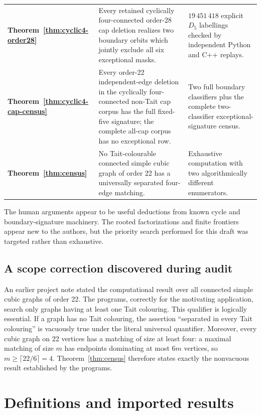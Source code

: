\documentclass[11pt]{article}
\theoremstyle{definition}
\theoremstyle{remark}
\begin{document}
\begin{center}
\begin{tabularx}{\textwidth}{@{}
  >{\raggedright\arraybackslash\bfseries}p{}
  >{\raggedright\arraybackslash}X
  >{\raggedright\arraybackslash}p{}@{}}
Theorem~\ref{thm:cyclic4-order28}
  & Every retained cyclically four-connected order-28 cap deletion
    realizes two boundary orbits which jointly exclude all six
    exceptional masks.
  & \(19\,451\,418\) explicit \(D_5\) labellings checked by independent
    Python and C++ replays.\\
Theorem~\ref{thm:cyclic4-cap-census}
  & Every order-22 independent-edge deletion in the cyclically
    four-connected non-Tait cap corpus has the full fixed-five signature;
    the complete all-cap corpus has no exceptional row.
  & Two full boundary classifiers plus the complete two-classifier
    exceptional-signature census.\\
Theorem~\ref{thm:census}
  & No Tait-colourable connected simple cubic graph of order 22 has a
    universally separated four-edge matching.
  & Exhaustive computation with two algorithmically different
    enumerators.\\
\bottomrule
\end{tabularx}
\end{center}

The human arguments appear to be useful deductions from known cycle and
boundary-signature machinery.  The rooted factorizations and finite
frontiers appear new to the authors, but the priority search performed
for this draft was targeted rather than exhaustive.

\subsection*{A scope correction discovered during audit}

An earlier project note stated the computational result over all
connected simple cubic graphs of order 22.  The programs, correctly for
the motivating application, search only graphs having at least one Tait
colouring.  This qualifier is logically essential.  If a graph has no
Tait colouring, the assertion ``separated in every Tait colouring'' is
vacuously true under the literal universal quantifier.  Moreover, every
cubic graph on 22 vertices has a matching of size at least four: a
maximal matching of size \(m\) has endpoints dominating at most \(6m\)
vertices, so \(m\geq\lceil22/6\rceil=4\).  Theorem~\ref{thm:census}
therefore states exactly the nonvacuous result established by the
programs.

\section{Definitions and imported results}
\end{document}
